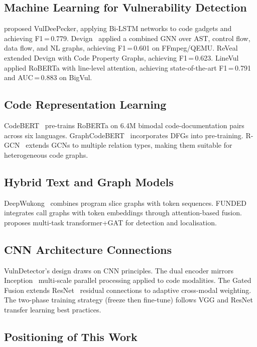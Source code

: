 \documentclass[12pt, letterpaper]{article}
\begin{document}
\subsection{Machine Learning for Vulnerability Detection}

\citet{li2018} proposed VulDeePecker, applying Bi-LSTM networks to code gadgets
and achieving F1\,=\,0.779. Devign~\citep{zhou2019} applied a combined GNN over
AST, control flow, data flow, and NL graphs, achieving F1\,=\,0.601 on
FFmpeg/QEMU. ReVeal~\citep{chakraborty2021} extended Devign with Code Property
Graphs, achieving F1\,=\,0.623. LineVul~\citep{fu2022} applied RoBERTa with
line-level attention, achieving state-of-the-art F1\,=\,0.791 and AUC\,=\,0.883
on BigVul.

\subsection{Code Representation Learning}

CodeBERT~\citep{feng2020} pre-trains RoBERTa on 6.4M bimodal code-documentation
pairs across six languages. GraphCodeBERT~\citep{guo2021} incorporates DFGs into
pre-training. R-GCN~\citep{schlichtkrull2018} extends GCNs to multiple relation
types, making them suitable for heterogeneous code graphs.

\subsection{Hybrid Text and Graph Models}

DeepWukong~\citep{cheng2021} combines program slice graphs with token sequences.
FUNDED~\citep{wang2021} integrates call graphs with token embeddings through
attention-based fusion. \citet{cao2022} proposes multi-task transformer+GAT for
detection and localisation.

\subsection{CNN Architecture Connections}

VulnDetector's design draws on CNN principles. The dual encoder mirrors
Inception~\citep{szegedy2015} multi-scale parallel processing applied to code
modalities. The Gated Fusion extends ResNet~\citep{he2016} residual connections
to adaptive cross-modal weighting. The two-phase training strategy (freeze then
fine-tune) follows VGG and ResNet transfer learning best practices.

\subsection{Positioning of This Work}
\end{document}
